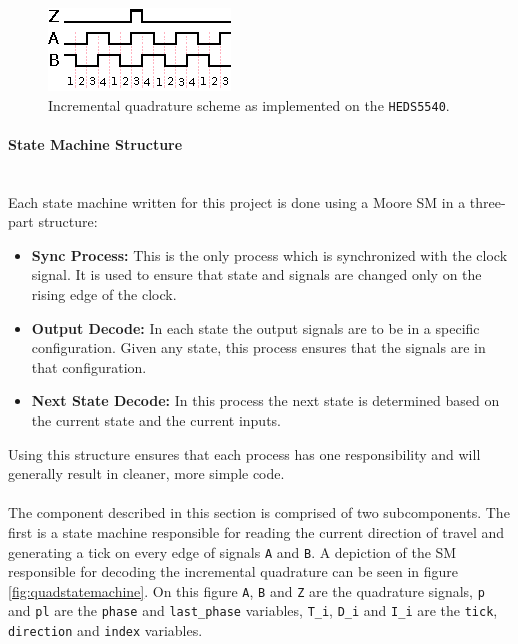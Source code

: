 \begin{figure}[h]
	\centering
	\includegraphics[width=.5\linewidth]{graphics/quadrature}
	\caption[Incremental quadrature as implemented on the \texttt{HEDS5540}]{Incremental quadrature scheme as implemented on the \texttt{HEDS5540}.}
	\label{fig:quadrature}
\end{figure}

\paragraph{State Machine Structure}~\\ %
\label{par:state_machine_structure}
Each state machine written for this project is done using a Moore SM in a three-part structure:
\begin{itemize}
	\item \textbf{Sync Process:} This is the only process which is synchronized with the clock signal.
	It is used to ensure that state and signals are changed only on the rising edge of the clock.
	\item \textbf{Output Decode:} In each state the output signals are to be in a specific configuration.
	Given any state, this process ensures that the signals are in that configuration.
	\item \textbf{Next State Decode:} In this process the next state is determined based on the current state and the current inputs.
\end{itemize}
Using this structure ensures that each process has one responsibility and will generally result in cleaner, more simple code.
\\~\\
The component described in this section is comprised of two subcomponents.
The first is a state machine responsible for reading the current direction of travel and generating a tick on every edge of signals \texttt{A} and \texttt{B}.
A depiction of the SM responsible for decoding the incremental quadrature can be seen in figure \ref{fig:quadstatemachine}.
On this figure \texttt{A}, \texttt{B} and \texttt{Z} are the quadrature signals, \texttt{p} and \texttt{pl} are the \texttt{phase} and \texttt{last\_phase} variables, \texttt{T\_i}, \texttt{D\_i} and \texttt{I\_i} are the \texttt{tick}, \texttt{direction} and \texttt{index} variables.
